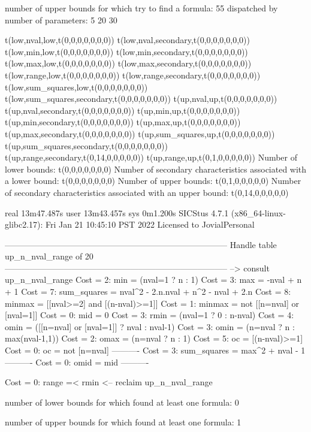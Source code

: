 number of upper bounds for which try to find a formula: 55
dispatched by number of parameters: 5  20  30

t(low,nval,low,t(0,0,0,0,0,0,0))
t(low,nval,secondary,t(0,0,0,0,0,0,0))
t(low,min,low,t(0,0,0,0,0,0,0))
t(low,min,secondary,t(0,0,0,0,0,0,0))
t(low,max,low,t(0,0,0,0,0,0,0))
t(low,max,secondary,t(0,0,0,0,0,0,0))
t(low,range,low,t(0,0,0,0,0,0,0))
t(low,range,secondary,t(0,0,0,0,0,0,0))
t(low,sum_squares,low,t(0,0,0,0,0,0,0))
t(low,sum_squares,secondary,t(0,0,0,0,0,0,0))
t(up,nval,up,t(0,0,0,0,0,0,0))
t(up,nval,secondary,t(0,0,0,0,0,0,0))
t(up,min,up,t(0,0,0,0,0,0,0))
t(up,min,secondary,t(0,0,0,0,0,0,0))
t(up,max,up,t(0,0,0,0,0,0,0))
t(up,max,secondary,t(0,0,0,0,0,0,0))
t(up,sum_squares,up,t(0,0,0,0,0,0,0))
t(up,sum_squares,secondary,t(0,0,0,0,0,0,0))
t(up,range,secondary,t(0,14,0,0,0,0,0))
t(up,range,up,t(0,1,0,0,0,0,0))
Number of lower bounds:                                             t(0,0,0,0,0,0,0)
Number of secondary characteristics associated with a lower bound:  t(0,0,0,0,0,0,0)
Number of upper bounds:                                             t(0,1,0,0,0,0,0)
Number of secondary characteristics associated with an upper bound: t(0,14,0,0,0,0,0)

real	13m47.487s
user	13m43.457s
sys	0m1.200s
SICStus 4.7.1 (x86_64-linux-glibc2.17): Fri Jan 21 10:45:10 PST 2022
Licensed to JovialPersonal


--------------------------------------------------------------------------------
Handle table up_n_nval_range of 20
--------------------------------------------------------------------------------
--> consult up_n_nval_range
Cost =  2:  min         = (nval=1 ? n : 1)
Cost =  3:  max         = -nval + n + 1
Cost =  7:  sum_squares = nval^2 - 2.n.nval + n^2 - nval + 2.n
Cost =  8:  minmax      = [[nval>=2] and [(n-nval)>=1]]
Cost =  1:  minmax      = not [[n=nval] or [nval=1]]
Cost =  0:  mid         = 0
Cost =  3:  rmin        = (nval=1 ? 0 : n-nval)
Cost =  4:  omin        = ([[n=nval] or [nval=1]] ? nval : nval-1)
Cost =  3:  omin        = (n=nval ? n : max(nval-1,1))
Cost =  2:  omax        = (n=nval ? n : 1)
Cost =  5:  oc          = [(n-nval)>=1]
Cost =  0:  oc          = not [n=nval]
----------
Cost =  3:  sum_squares = max^2 + nval - 1
----------
Cost =  0:  omid        = mid
----------

Cost =  0:  range =< rmin
<-- reclaim up_n_nval_range

number of lower bounds for which found at least one formula: 0

number of upper bounds for which found at least one formula: 1

